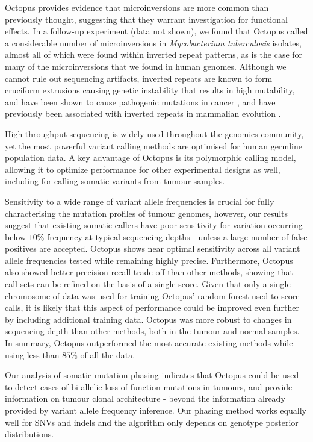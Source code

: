 \documentclass[notitlepage, twocolumn, 10pt]{article}
\begin{document}
Octopus provides evidence that microinversions are more common than previously thought, suggesting that they warrant investigation for functional effects. In a follow-up experiment (data not shown), we found that Octopus called a considerable number of microinversions in \textit{Mycobacterium tuberculosis} isolates, almost all of which were found within inverted repeat patterns, as is the case for many of the microinversions that we found in human genomes. Although we cannot rule out sequencing artifacts, inverted repeats are known to form cruciform extrusions causing genetic instability that results in high mutability, and have been shown to cause pathogenic mutations in cancer \cite{RN615}, and have previously been associated with inverted repeats in mammalian evolution \cite{RN561, RN618}.

High-throughput sequencing is widely used throughout the genomics community, yet the most powerful variant calling methods are optimised for human germline population data. A key advantage of Octopus is its polymorphic calling model, allowing it to optimize performance for other experimental designs as well, including for calling somatic variants from tumour samples.

Sensitivity to a wide range of variant allele frequencies is crucial for fully characterising the mutation profiles of tumour genomes, however, our results suggest that existing somatic callers have poor sensitivity for variation occurring below $10\%$ frequency at typical sequencing depths - unless a large number of false positives are accepted. Octopus shows near optimal sensitivity across all variant allele frequencies tested while remaining highly precise. Furthermore, Octopus also showed better precision-recall trade-off than other methods, showing that call sets can be refined on the basis of a single score. Given that only a single chromosome of data was used for training Octopus' random forest used to score calls, it is likely that this aspect of performance could be improved even further by including additional training data. Octopus was more robust to changes in sequencing depth than other methods, both in the tumour and normal samples. In summary, Octopus outperformed the most accurate existing methods while using less than $85\%$ of all the data.

Our analysis of somatic mutation phasing indicates that Octopus could be used to detect cases of bi-allelic loss-of-function mutations in tumours, and provide information on tumour clonal architecture - beyond the information already provided by variant allele frequency inference. Our phasing method works equally well for SNVs and indels and the algorithm only depends on genotype posterior distributions.
\end{document}
